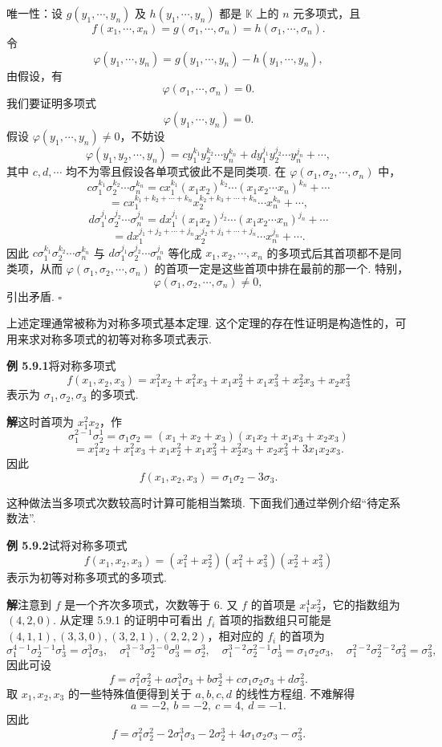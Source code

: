 \documentclass[UTF8,12pt,a4paper,fontset=fandol]{ctexart}
\begin{document}
唯一性：设 $g(y_1,\cdots,y_n)$ 及 $h(y_1,\cdots,y_n)$ 都是 $\mathbb{K}$ 上的 $n$ 元多项式，且
\[
f(x_1,\cdots,x_n)=g(\sigma_1,\cdots,\sigma_n)=h(\sigma_1,\cdots,\sigma_n).
\]
令
\[
\varphi(y_1,\cdots,y_n)=g(y_1,\cdots,y_n)-h(y_1,\cdots,y_n),
\]
由假设，有
\[
\varphi(\sigma_1,\cdots,\sigma_n)=0.
\]
我们要证明多项式
\[
\varphi(y_1,\cdots,y_n)=0.
\]
假设 $\varphi(y_1,\cdots,y_n)\neq 0$，不妨设
\[
\varphi(y_1,y_2,\cdots,y_n)=cy_1^{k_1}y_2^{k_2}\cdots y_n^{k_n}+dy_1^{j_1}y_2^{j_2}\cdots y_n^{j_n}+\cdots,
\]
其中 $c,d,\cdots$ 均不为零且假设各单项式彼此不是同类项. 在 $\varphi(\sigma_1,\sigma_2,\cdots,\sigma_n)$ 中，
\[
c\sigma_1^{k_1}\sigma_2^{k_2}\cdots\sigma_n^{k_n}
=cx_1^{k_1}(x_1x_2)^{k_2}\cdots(x_1x_2\cdots x_n)^{k_n}+\cdots
\]
\[
=cx_1^{k_1+k_2+\cdots+k_n}x_2^{k_2+k_3+\cdots+k_n}\cdots x_n^{k_n}+\cdots,
\]
\[
d\sigma_1^{j_1}\sigma_2^{j_2}\cdots\sigma_n^{j_n}
=dx_1^{j_1}(x_1x_2)^{j_2}\cdots(x_1x_2\cdots x_n)^{j_n}+\cdots
\]
\[
=dx_1^{j_1+j_2+\cdots+j_n}x_2^{j_2+j_3+\cdots+j_n}\cdots x_n^{j_n}+\cdots.
\]
因此 $c\sigma_1^{k_1}\sigma_2^{k_2}\cdots\sigma_n^{k_n}$ 与 $d\sigma_1^{j_1}\sigma_2^{j_2}\cdots\sigma_n^{j_n}$ 等化成 $x_1,x_2,\cdots,x_n$ 的多项式后其首项都不是同类项，从而 $\varphi(\sigma_1,\sigma_2,\cdots,\sigma_n)$ 的首项一定是这些首项中排在最前的那一个. 特别，
\[
\varphi(\sigma_1,\sigma_2,\cdots,\sigma_n)\neq 0,
\]
引出矛盾. $\square$

上述定理通常被称为对称多项式基本定理. 这个定理的存在性证明是构造性的，可用来求对称多项式的初等对称多项式表示.

\noindent\textbf{例 5.9.1}\quad 将对称多项式
\[
f(x_1,x_2,x_3)=x_1^2x_2+x_1^2x_3+x_1x_2^2+x_1x_3^2+x_2^2x_3+x_2x_3^2
\]
表示为 $\sigma_1,\sigma_2,\sigma_3$ 的多项式.

\noindent\textbf{解}\quad 这时首项为 $x_1^2x_2$，作
\[
\sigma_1^{2-1}\sigma_2^1=\sigma_1\sigma_2=(x_1+x_2+x_3)(x_1x_2+x_1x_3+x_2x_3)
\]
\[
=x_1^2x_2+x_1^2x_3+x_1x_2^2+x_1x_3^2+x_2^2x_3+x_2x_3^2+3x_1x_2x_3.
\]
因此
\[
f(x_1,x_2,x_3)=\sigma_1\sigma_2-3\sigma_3.
\]

这种做法当多项式次数较高时计算可能相当繁琐. 下面我们通过举例介绍“待定系数法”.

\noindent\textbf{例 5.9.2}\quad 试将对称多项式
\[
f(x_1,x_2,x_3)=(x_1^2+x_2^2)(x_1^2+x_3^2)(x_2^2+x_3^2)
\]
表示为初等对称多项式的多项式.

\noindent\textbf{解}\quad 注意到 $f$ 是一个齐次多项式，次数等于 6. 又 $f$ 的首项是 $x_1^4x_2^2$，它的指数组为 $(4,2,0)$. 从定理 5.9.1 的证明中可看出 $f_i$ 首项的指数组只可能是 $(4,1,1),(3,3,0),(3,2,1),(2,2,2)$，相对应的 $f_i$ 的首项为
\[
\sigma_1^{4-1}\sigma_2^{1-1}\sigma_3^1=\sigma_1^3\sigma_3,\quad
\sigma_1^{3-3}\sigma_2^{3-0}\sigma_3^0=\sigma_2^3,\quad
\sigma_1^{3-2}\sigma_2^{2-1}\sigma_3^1=\sigma_1\sigma_2\sigma_3,\quad
\sigma_1^{2-2}\sigma_2^{2-2}\sigma_3^2=\sigma_3^2,
\]
因此可设
\[
f=\sigma_1^2\sigma_2^2+a\sigma_1^3\sigma_3+b\sigma_2^3+c\sigma_1\sigma_2\sigma_3+d\sigma_3^2.
\]
取 $x_1,x_2,x_3$ 的一些特殊值便得到关于 $a,b,c,d$ 的线性方程组. 不难解得
\[
a=-2,\ b=-2,\ c=4,\ d=-1.
\]
因此
\[
f=\sigma_1^2\sigma_2^2-2\sigma_1^3\sigma_3-2\sigma_2^3+4\sigma_1\sigma_2\sigma_3-\sigma_3^2.
\]
\end{document}
